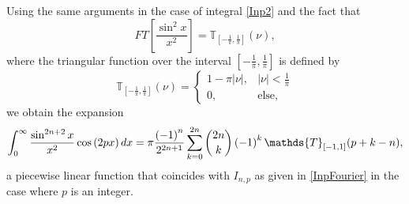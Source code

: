 \documentclass[11pt,oneside,reqno]{article}
\newtheorem*{proposition}{Proposition}
\theoremstyle{definition}
\begin{document}
Using the same arguments in the case of integral \eqref{Inp2} and the fact that 
\begin{equation}
FT\left[\frac{\sin^2 x}{x^2}\right]=\mathds{T}_{\left[-\frac{1}{\pi},\frac{1}{\pi}\right]}\left(\nu\right),
\end{equation}
where the triangular function over the interval $\left[-\frac{1}{\pi},\frac{1}{\pi}\right]$ is defined by
\[
\mathds{T}_{\left[-\frac{1}{\pi},\frac{1}{\pi}\right]}(\nu) = \begin{cases}
    1-\pi\vert \nu \vert, & \vert \nu \vert < \frac{1}{\pi}  \\
    0, & \text{else},
\end{cases}
\]
we obtain the expansion
\[
\int_{0}^{\infty}\frac{\sin^{2n+2}x}{x^{2}}\cos\left(2px\right)dx\\
=\pi \frac{\left(-1\right)^{n}}{2^{2n+1}}\sum_{k=0}^{2n}\binom{2n}{k}
\left(-1\right)^{k}
\mathds{T}_{\left[-1,1\right]}(p+k-n),
\]
a piecewise linear function
that coincides with $I_{n,p}$ as given in \eqref{InpFourier} in the case where $p$ is an integer.
\end{document}

